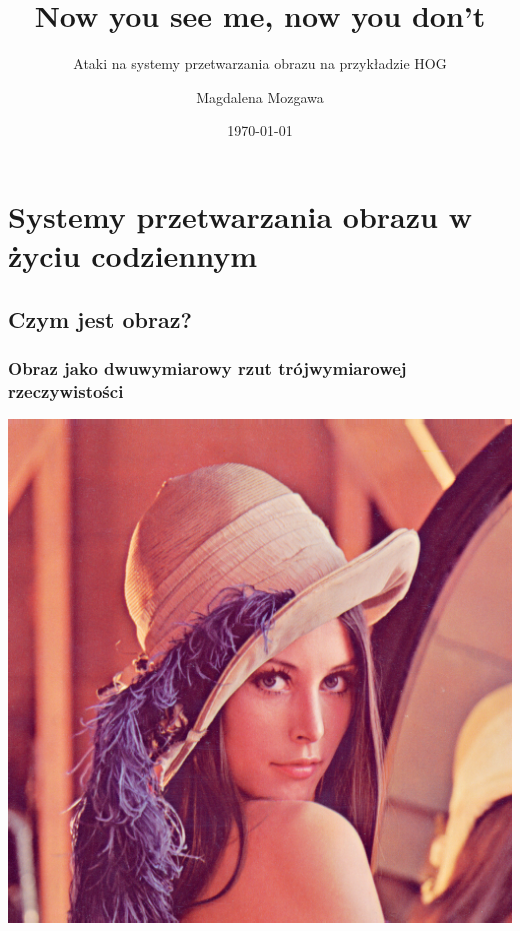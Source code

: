 \documentclass{beamer}
\title{Now you see me, now you don't}
\subtitle{Ataki na systemy przetwarzania obrazu na przykładzie HOG}
\author{Magdalena Mozgawa}
\institute{WMI UAM}
\date{\today}
\begin{document}
    \begin{frame}
        \titlepage
    \end{frame}


    \section{Systemy przetwarzania obrazu w życiu codziennym}

        \subsection{Czym jest obraz?}

            \begin{frame}
                \begin{center}
                    \frametitle{Obraz jako dwuwymiarowy rzut trójwymiarowej rzeczywistości}
                    \includegraphics[height=0.8\textheight]{pictures/Lenna.png}
                \end{center} 
            \end{frame}
\end{document}
